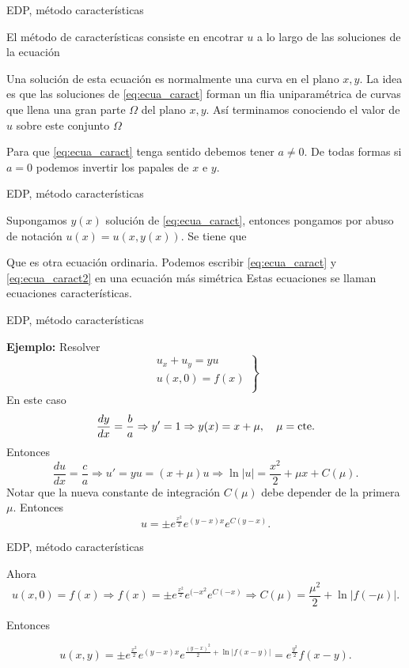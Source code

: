 \documentclass[handout,hyperref={colorlinks=true}]{beamer}
\renewcommand{\emph}[1]{\textcolor[rgb]{1,0,0}{#1}}
\begin{document}
\begin{frame}{EDP, método características}

\onslide<+-> El método de características consiste en encotrar $u$ a lo largo de las soluciones de la ecuación


\onslide<+-> Una solución de esta ecuación es normalmente una curva en el plano  $x,y$. La idea es que las soluciones de \eqref{eq:ecua_caract} forman un flia uniparamétrica
 de curvas que llena una gran parte $\Omega$ del plano $x,y$.  Así terminamos conociendo el valor de $u$ sobre este conjunto $\Omega$ 

\onslide<+-> Para que \eqref{eq:ecua_caract} tenga sentido debemos tener $a\neq 0$. De todas formas si $a=0$ podemos invertir los papales de $x$ e $y$.
\end{frame}

\begin{frame}{EDP, método características}


\onslide<+-> Supongamos $y(x)$ solución de \eqref{eq:ecua_caract}, entonces pongamos por abuso de notación $u(x)=u(x,y(x))$. Se tiene que

Que es otra ecuación ordinaria. Podemos escribir  \eqref{eq:ecua_caract} y \eqref{eq:ecua_caract2} en una ecuación más simétrica
Estas ecuaciones se llaman \emph{ecuaciones características}.

\end{frame}

\begin{frame}{EDP, método características}

\textbf{Ejemplo:} Resolver
\begin{equation}\label{eq:EDP_gral_1orden}
  \left.\begin{array}{l}
  u_x+u_y=yu\\
  u(x,0)=f(x)\\
\end{array}\right\}
\end{equation}
En este caso
\[\frac{dy}{dx}=\frac{b}{a}\Rightarrow y'=1\Rightarrow y(x)=x+\mu,\quad\mu=\hbox{cte}.\]
Entonces
\[\frac{du}{dx}=\frac{c}{a}\Rightarrow u'=yu=(x+\mu)u\Rightarrow \ln|u|=\frac{x^2}{2}+\mu x+C(\mu).\]
Notar que la nueva constante de integración $C(\mu)$ debe depender de la primera $\mu$. Entonces
\[u=\pm e^{\frac{x^2}{2}}e^{(y-x)x}e^{C(y-x)}.\]

\end{frame}

\begin{frame}{EDP, método características}

Ahora
\[u(x,0)=f(x)\Rightarrow f(x)=\pm e^{\frac{x^2}{2}}e^{(-x^2}e^{C(-x)}\Rightarrow C(\mu)=\frac{\mu^2}{2}+\ln|f(-\mu)|.\]

Entonces

\[u(x,y)=\pm e^{\frac{x^2}{2}}e^{(y-x)x}e^{\frac{(y-x)^2}{2}+\ln|f(x-y)|        }
=e^{\frac{y^2}{2}}f(x-y).\]



\end{frame}
\end{document}
